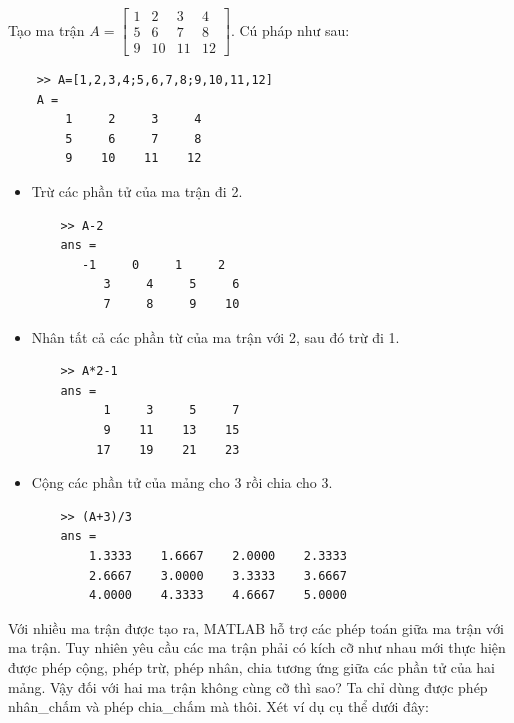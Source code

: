 \documentclass[12pt,a4paper]{article}
\begin{document}
\begin{example}
Tạo ma trận $A=\begin{bmatrix} 1 & 2 & 3 & 4 \\ 5 & 6 & 7 & 8 \\ 9 & 10 & 11 & 12 \end{bmatrix}$. Cú pháp như sau:\\
\begin{lstlisting}
	>> A=[1,2,3,4;5,6,7,8;9,10,11,12]
	A =
     	1     2     3     4
     	5     6     7     8
     	9    10    11    12
\end{lstlisting}
\begin{itemize}
	\item Trừ các phần tử của ma trận đi 2.
\begin{lstlisting}
	>> A-2
	ans =
       -1     0     1     2
     	  3     4     5     6
     	  7     8     9    10
\end{lstlisting}
	\item Nhân tất cả các phần từ của ma trận với 2, sau đó trừ đi 1.
\begin{lstlisting}
	>> A*2-1
	ans =
     	  1     3     5     7
     	  9    11    13    15
    	 17    19    21    23
\end{lstlisting}
	\item Cộng các phần tử của mảng cho 3 rồi chia cho 3.
\begin{lstlisting}
	>> (A+3)/3
	ans =
    	1.3333    1.6667    2.0000    2.3333
    	2.6667    3.0000    3.3333    3.6667
    	4.0000    4.3333    4.6667    5.0000
\end{lstlisting}
\end{itemize}
\end{example}
Với nhiều ma trận được tạo ra, MATLAB hỗ trợ các phép toán giữa ma trận với ma trận. Tuy nhiên yêu cầu các ma trận phải có kích cỡ như nhau mới thực hiện được phép cộng, phép trừ, phép nhân, chia tương ứng giữa các phần tử của hai mảng. Vậy đối với hai ma trận không cùng cỡ thì sao? Ta chỉ dùng được phép nhân\_chấm và phép chia\_chấm mà thôi. Xét ví dụ cụ thể dưới đây:
\end{document}
